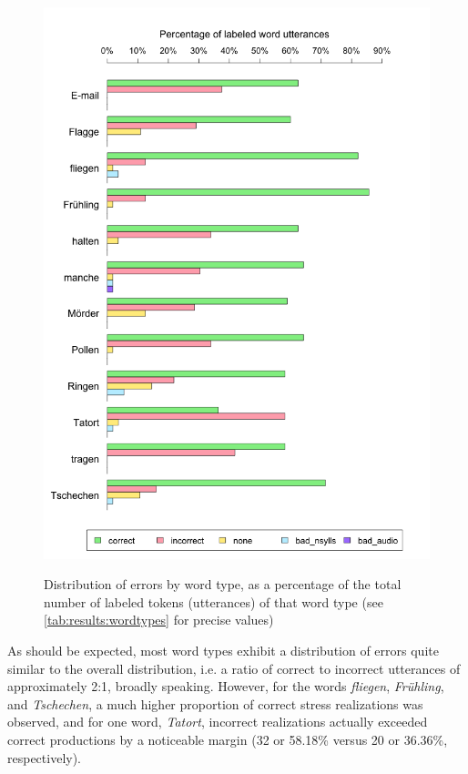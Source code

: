 			
			

			\begin{figure}[tbp]
				\centering
				\caption[Error distribution by word type]{Distribution of errors by word type,
				as a percentage of the total number of labeled tokens (utterances) of that word type 
				(see \cref{tab:results:wordtypes} for precise values)
				}
				\includegraphics[width=\textwidth]{img/plots/judgmentsWordTypes}
				\label{fig:results:wordbars}
			\end{figure}	
			
			As should be expected, most word types exhibit a distribution of errors quite similar to the overall distribution, i.e. a ratio of correct to incorrect utterances of approximately 2:1, broadly speaking. However, for the words \textit{fliegen}, \textit{Fr\"{u}hling}, and \textit{Tschechen}, a much higher proportion of correct stress realizations was observed,
			and for one word, \textit{Tatort}, incorrect realizations actually exceeded correct productions by a noticeable margin (32 or 58.18\% versus 20 or 36.36\%, respectively). 
			
